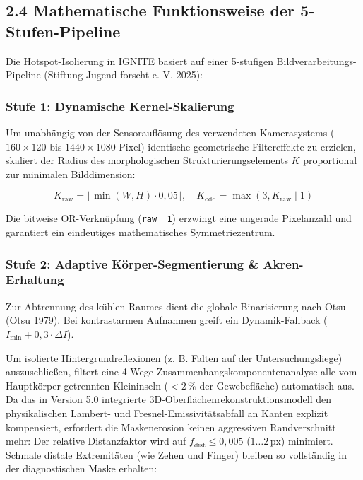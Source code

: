 \documentclass[
  11pt,
]{article}
\begin{document}
\subsection{2.4 Mathematische Funktionsweise der
5-Stufen-Pipeline}\label{mathematische-funktionsweise-der-5-stufen-pipeline}

Die Hotspot-Isolierung in IGNITE basiert auf einer 5-stufigen
Bildverarbeitungs-Pipeline (Stiftung Jugend forscht e. V. 2025):

\subsubsection{Stufe 1: Dynamische
Kernel-Skalierung}\label{stufe-1-dynamische-kernel-skalierung}

Um unabhängig von der Sensorauflösung des verwendeten Kamerasystems
(\(160 \times 120\) bis \(1440 \times 1080\) Pixel) identische
geometrische Filtereffekte zu erzielen, skaliert der Radius des
morphologischen Strukturierungselements \(K\) proportional zur minimalen
Bilddimension:

\[ K_{\text{raw}} = \lfloor \min(W, H) \cdot 0{,}05 \rfloor, \quad K_{\text{odd}} = \max(3, K_{\text{raw}} \mid 1) \]

Die bitweise OR-Verknüpfung (\texttt{raw\ \textbar{}\ 1}) erzwingt eine
ungerade Pixelanzahl und garantiert ein eindeutiges mathematisches
Symmetriezentrum.

\subsubsection{Stufe 2: Adaptive Körper-Segmentierung \&
Akren-Erhaltung}\label{stufe-2-adaptive-kuxf6rper-segmentierung-akren-erhaltung}

Zur Abtrennung des kühlen Raumes dient die globale Binarisierung nach
Otsu (Otsu 1979). Bei kontrastarmen Aufnahmen greift ein
Dynamik-Fallback (\(I_{\min} + 0{,}3 \cdot \Delta I\)).

Um isolierte Hintergrundreflexionen (z. B. Falten auf der
Untersuchungsliege) auszuschließen, filtert eine
4-Wege-Zusammenhangskomponentenanalyse alle vom Hauptkörper getrennten
Kleininseln (\(< 2\,\%\) der Gewebefläche) automatisch aus. Da das in
Version 5.0 integrierte 3D-Oberflächenrekonstruktionsmodell den
physikalischen Lambert- und Fresnel-Emissivitätsabfall an Kanten
explizit kompensiert, erfordert die Maskenerosion keinen aggressiven
Randverschnitt mehr: Der relative Distanzfaktor wird auf
\(f_{\text{dist}} \le 0{,}005\) (\(1\dots 2\,\text{px}\)) minimiert.
Schmale distale Extremitäten (wie Zehen und Finger) bleiben so
vollständig in der diagnostischen Maske erhalten:
\end{document}
